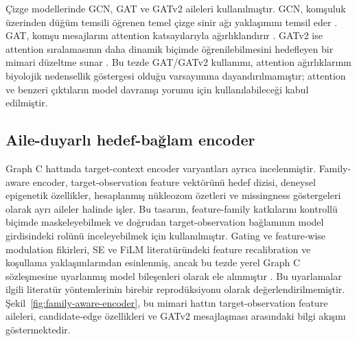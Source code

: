 Çizge modellerinde GCN, GAT ve GATv2 aileleri kullanılmıştır. GCN, komşuluk üzerinden düğüm temsili öğrenen temel çizge sinir ağı yaklaşımını temsil eder . GAT, komşu mesajlarını attention katsayılarıyla ağırlıklandırır . GATv2 ise attention sıralamasının daha dinamik biçimde öğrenilebilmesini hedefleyen bir mimari düzeltme sunar . Bu tezde GAT/GATv2 kullanımı, attention ağırlıklarının biyolojik nedensellik göstergesi olduğu varsayımına dayandırılmamıştır; attention ve benzeri çıktıların model davranışı yorumu için kullanılabileceği kabul edilmiştir.

\subsection{Aile-duyarlı hedef-bağlam encoder}

Graph C hattında target-context encoder varyantları ayrıca incelenmiştir. Family-aware encoder, target-observation feature vektörünü hedef dizisi, deneysel epigenetik özellikler, hesaplanmış nükleozom özetleri ve missingness göstergeleri olarak ayrı aileler halinde işler. Bu tasarım, feature-family katkılarını kontrollü biçimde maskeleyebilmek ve doğrudan target-observation bağlamının model girdisindeki rolünü inceleyebilmek için kullanılmıştır. Gating ve feature-wise modulation fikirleri, SE ve FiLM literatüründeki feature recalibration ve koşullama yaklaşımlarından esinlenmiş, ancak bu tezde yerel Graph C sözleşmesine uyarlanmış model bileşenleri olarak ele alınmıştır . Bu uyarlamalar ilgili literatür yöntemlerinin birebir reprodüksiyonu olarak değerlendirilmemiştir. Şekil~\ref{fig:family-aware-encoder}, bu mimari hattın target-observation feature aileleri, candidate-edge özellikleri ve GATv2 mesajlaşması arasındaki bilgi akışını göstermektedir.


